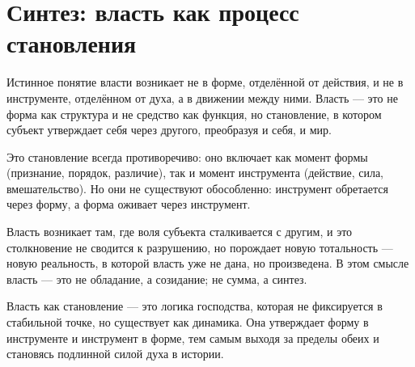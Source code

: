 \section{Синтез: власть как процесс становления}

Истинное понятие власти возникает не в форме, отделённой от действия, и не в инструменте, отделённом от духа, а в движении между ними. Власть — это не форма как структура и не средство как функция, но становление, в котором субъект утверждает себя через другого, преобразуя и себя, и мир.

Это становление всегда противоречиво: оно включает как момент формы (признание, порядок, различие), так и момент инструмента (действие, сила, вмешательство). Но они не существуют обособленно: инструмент обретается через форму, а форма оживает через инструмент.

Власть возникает там, где воля субъекта сталкивается с другим, и это столкновение не сводится к разрушению, но порождает новую тотальность — новую реальность, в которой власть уже не дана, но произведена. В этом смысле власть — это не обладание, а созидание; не сумма, а синтез.

Власть как становление — это логика господства, которая не фиксируется в стабильной точке, но существует как динамика. Она утверждает форму в инструменте и инструмент в форме, тем самым выходя за пределы обеих и становясь подлинной силой духа в истории.

